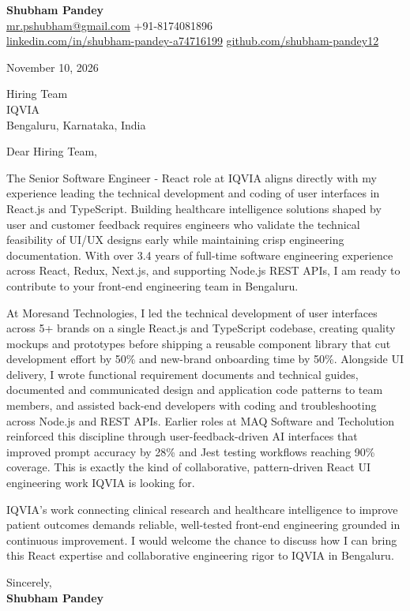 \documentclass[a4paper,11pt]{article}
\begin{document}
\textbf{\Large Shubham Pandey}\\
\href{mailto:mr.pshubham@gmail.com}{mr.pshubham@gmail.com} \quad +91-8174081896\\
\href{https://www.linkedin.com/in/shubham-pandey-a74716199/}{linkedin.com/in/shubham-pandey-a74716199} \quad
\href{https://github.com/shubham-pandey12}{github.com/shubham-pandey12}

\vspace{1em}
November 10, 2026

\vspace{1em}
Hiring Team\\
IQVIA\\
Bengaluru, Karnataka, India

\vspace{1em}
Dear Hiring Team,

The Senior Software Engineer - React role at IQVIA aligns directly with my experience leading the technical development and coding of user interfaces in React.js and TypeScript. Building healthcare intelligence solutions shaped by user and customer feedback requires engineers who validate the technical feasibility of UI/UX designs early while maintaining crisp engineering documentation. With over 3.4 years of full-time software engineering experience across React, Redux, Next.js, and supporting Node.js REST APIs, I am ready to contribute to your front-end engineering team in Bengaluru.

At Moresand Technologies, I led the technical development of user interfaces across 5+ brands on a single React.js and TypeScript codebase, creating quality mockups and prototypes before shipping a reusable component library that cut development effort by 50\% and new-brand onboarding time by 50\%. Alongside UI delivery, I wrote functional requirement documents and technical guides, documented and communicated design and application code patterns to team members, and assisted back-end developers with coding and troubleshooting across Node.js and REST APIs. Earlier roles at MAQ Software and Techolution reinforced this discipline through user-feedback-driven AI interfaces that improved prompt accuracy by 28\% and Jest testing workflows reaching 90\% coverage. This is exactly the kind of collaborative, pattern-driven React UI engineering work IQVIA is looking for.

IQVIA's work connecting clinical research and healthcare intelligence to improve patient outcomes demands reliable, well-tested front-end engineering grounded in continuous improvement. I would welcome the chance to discuss how I can bring this React expertise and collaborative engineering rigor to IQVIA in Bengaluru.

\vspace{1em}
Sincerely,\\[0.5em]
\textbf{Shubham Pandey}
\end{document}
